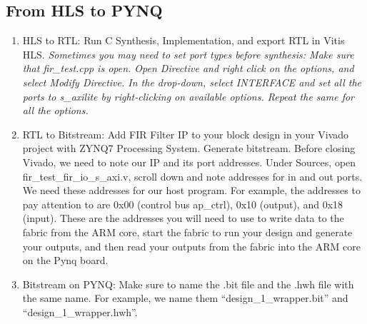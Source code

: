 \documentclass[a4paper,12pt,twoside]{article}
\begin{document}
\subsection{From HLS to PYNQ}
\begin{enumerate}
    \item HLS to RTL: Run C Synthesis, Implementation, and export RTL in Vitis HLS. \textit{Sometimes you may need to set port types before synthesis: Make sure that fir\_test.cpp is open. Open Directive and right click on the options, and select Modify Directive. In the drop-down, select INTERFACE and set all the ports to s\_axilite by right-clicking on available options. Repeat the same for all the options.}
    \item RTL to Bitstream: Add FIR Filter IP to your block design in your Vivado project with ZYNQ7 Processing System. Generate bitstream. Before closing Vivado, we need to note our IP and its port addresses. Under Sources, open fir\_test\_fir\_io\_s\_axi.v, scroll down and note addresses for in and out ports. We need these addresses for our host program. For example, the addresses to pay attention to are 0x00 (control bus ap\_ctrl), 0x10 (output), and 0x18 (input). These are the addresses you will need to use to write data to the fabric from the ARM core, start the fabric to run your design and generate your outputs, and then read your outputs from the fabric into the ARM core on the Pynq board.
    \item Bitstream on PYNQ: Make sure to name the .bit file and the .hwh file with the same name. For example, we name them “design\_1\_wrapper.bit” and “design\_1\_wrapper.hwh”.
\end{enumerate}
\end{document}
